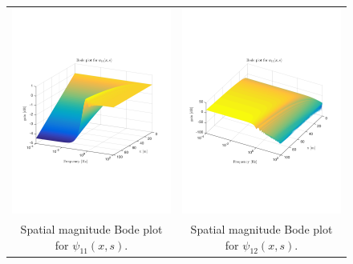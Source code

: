 \documentclass[preprint]{elsarticle}
\begin{document}

\begin{figure}
\centering
\begin{tabular}{cc}
\includegraphics[trim = 0mm 60mm 0mm 60mm, width = 8cm]{distr_psi_11}
&
\includegraphics[trim = 0mm 60mm 0mm 60mm, width = 8cm]{distr_psi_12}
\tabularnewline
Spatial magnitude Bode plot for $\psi_{11}(x,s)$.
&
Spatial magnitude Bode plot for $\psi_{12}(x,s)$.

\end{tabular}
\end{figure}
\end{document}
